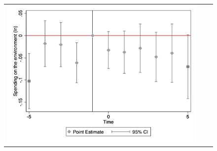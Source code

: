 \begin{figure}[ht]
\begin{tabular}{@{}ccc@{}}
\begin{minipage}[t]{0.32\textwidth}
            \includegraphics[width=\linewidth]{images/eventdd_ln_q4_09_step1.jpg}
            \label{fig:environment}
        \end{minipage}
    \end{tabular}
\end{figure}
